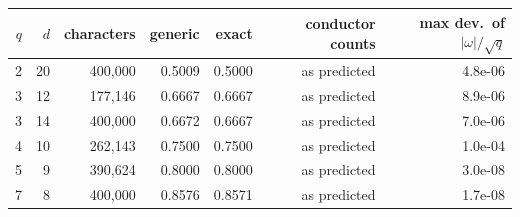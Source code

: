 \begin{tabular}{rrrrrrr}
\toprule
$q$ & $d$ & characters & generic & exact & conductor counts & max dev.\ of $|\omega|/\sqrt q$ \\
\midrule
2 & 20 & 400{,}000 & 0.5009 & 0.5000 & as predicted & 4.8e-06 \\
3 & 12 & 177{,}146 & 0.6667 & 0.6667 & as predicted & 8.9e-06 \\
3 & 14 & 400{,}000 & 0.6672 & 0.6667 & as predicted & 7.0e-06 \\
4 & 10 & 262{,}143 & 0.7500 & 0.7500 & as predicted & 1.0e-04 \\
5 & 9 & 390{,}624 & 0.8000 & 0.8000 & as predicted & 3.0e-08 \\
7 & 8 & 400{,}000 & 0.8576 & 0.8571 & as predicted & 1.7e-08 \\
\bottomrule
\end{tabular}